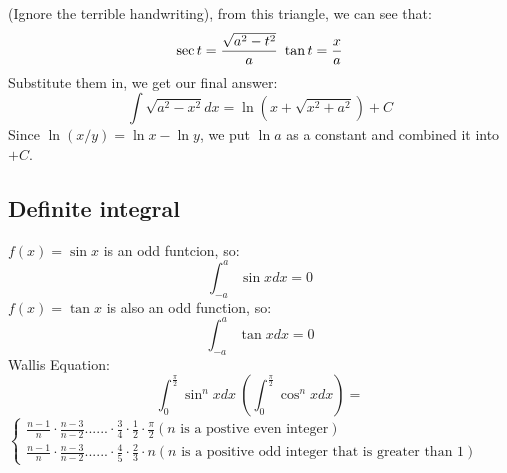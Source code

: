\documentclass{article}
\begin{document}
(Ignore the terrible handwriting), from this triangle, we can see that:
\[
    \sec t = \frac{\sqrt{a^2-t^2}}{a} \ \tan t = \frac{x}{a}\\
\]
Substitute them in, we get our final answer:
\begin{equation}
    \int \sqrt{a^2-x^2}dx = \ln(x+\sqrt{x^2+a^2}) + C
\end{equation}
Since $\ln(x/y) = \ln x - \ln y$, we put $\ln a$ as a constant and combined it into $+C$.

\subsection{Definite integral}
$f(x) = \sin x$ is an odd funtcion, so:
\begin{equation}
    \int_{-a}^{a} \sin x dx = 0
\end{equation}
$f(x) = \tan x$ is also an odd function, so:
\begin{equation}
    \int_{-a}^{a} \tan x dx = 0
\end{equation}
Wallis Equation:
\begin{equation}
    \int_0^{\frac{\pi}{2}} \sin^n x dx \ (\int_0^{\frac{\pi}{2}}\cos^n x dx) = 
\end{equation}
$\begin{cases}
    \frac{n-1}{n} \cdot \frac{n-3}{n-2} ...... \cdot \frac{3}{4} \cdot \frac{1}{2} \cdot \frac{\pi}{2} (\text{$n$ is a postive even integer})\\
    \frac{n-1}{n} \cdot \frac{n-3}{n-2} ...... \cdot \frac{4}{5} \cdot \frac{2}{3} \cdot n (\text{$n$ is a positive odd integer that is greater than 1})
\end{cases}$


\newpage
\end{document}
